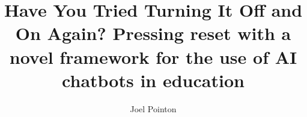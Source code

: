 \documentclass[a4paper2pt,twoside]{report}
\begin{document}
\let\cleardoublepage\clearpage %
\title{Have You Tried Turning It Off and On Again? Pressing reset with a novel framework for the use of AI chatbots in education} %

\author{Joel Pointon}

\normallinespacing
\maketitle


\preface
\let\cleardoublepage\clearpage





\body







% 





\clearpage
\printglossary[type=\acronymtype]
\printglossary
\end{document}

